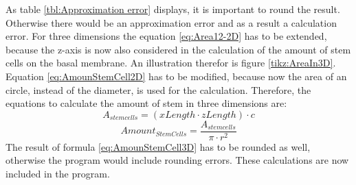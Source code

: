 As table \ref{tbl:Approximation error} displays, it is important to round the result. Otherwise there would be an approximation error and as a result a calculation error. \newline
For three dimensions the equation \ref{eq:Area12-2D} has to be extended, because the z-axis is now also considered in the calculation of the amount of stem cells on the basal membrane. An illustration therefor is figure \ref{tikz:AreaIn3D}. Equation \ref{eq:AmounStemCell2D} has to be modified, because now the area of an circle, instead of the diameter, is used for the calculation. Therefore, the equations to calculate the amount of stem in three dimensions are:
\begin{equation}\label{eq:Area12-3D}
A_{stem cells} = (xLength \cdot zLength) \cdot c
\end{equation}
\begin{equation}\label{eq:AmounStemCell3D}
Amount_{StemCells} = \dfrac{A_{stem cells}}{\pi \cdot r^{2}} 
\end{equation}
The result of formula \ref{eq:AmounStemCell3D} has to be rounded as well, otherwise the program would include rounding errors. 
These calculations are now included in the program.

%
%        
%
%


